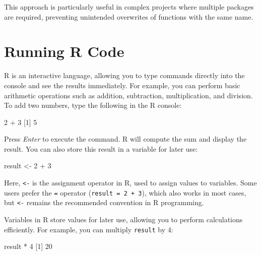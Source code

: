 \documentclass[
  11pt,
]{book}
\makeatletter
\newenvironment{Shaded}{}{}
\newcommand{\DecValTok}[1]{#1}
\newcommand{\NormalTok}[1]{#1}
\newcommand{\OtherTok}[1]{\textcolor[rgb]{0.39,0.39,0.39}{#1}}
\newcommand{\SpecialCharTok}[1]{\textcolor[rgb]{0.39,0.39,0.39}{#1}}
\newenvironment{kframe}{%
\medskip{}
\setlength{\fboxsep}{.8em}
 \def\at@end@of@kframe{}%
 \ifinner\ifhmode%
  \def\at@end@of@kframe{\end{minipage}}%
  \begin{minipage}{\columnwidth}%
 \fi\fi%
 \def\FrameCommand##1{\hskip\@totalleftmargin \hskip-\fboxsep
 \colorbox{shadecolor}{##1}\hskip-\fboxsep
     \hskip-\linewidth \hskip-\@totalleftmargin \hskip\columnwidth}%
 \MakeFramed {\advance\hsize-\width
   \@totalleftmargin\z@ \linewidth\hsize
   \@setminipage}}%
 {\par\unskip\endMakeFramed%
 \at@end@of@kframe}
\renewenvironment{Shaded}{\begin{kframe}}{\end{kframe}}
\theoremstyle{definition}
\theoremstyle{definition}
\theoremstyle{definition}
\theoremstyle{definition}
\theoremstyle{remark}
\makeatother
\begin{document}
This approach is particularly useful in complex projects where multiple packages are required, preventing unintended overwrites of functions with the same name.

\section{Running R Code}\label{running-r-code}

R is an interactive language, allowing you to type commands directly into the console and see the results immediately. For example, you can perform basic arithmetic operations such as addition, subtraction, multiplication, and division. To add two numbers, type the following in the R console:

\begin{Shaded}
\begin{Highlighting}[]
\DecValTok{2} \SpecialCharTok{+} \DecValTok{3}
\NormalTok{   [}\DecValTok{1}\NormalTok{] }\DecValTok{5}
\end{Highlighting}
\end{Shaded}

Press \emph{Enter} to execute the command. R will compute the sum and display the result. You can also store this result in a variable for later use:

\begin{Shaded}
\begin{Highlighting}[]
\NormalTok{result }\OtherTok{\textless{}{-}} \DecValTok{2} \SpecialCharTok{+} \DecValTok{3}
\end{Highlighting}
\end{Shaded}

Here, \texttt{\textless{}-} is the assignment operator in R, used to assign values to variables. Some users prefer the \texttt{=} operator (\texttt{result\ =\ 2\ +\ 3}), which also works in most cases, but \texttt{\textless{}-} remains the recommended convention in R programming.

Variables in R store values for later use, allowing you to perform calculations efficiently. For example, you can multiply \texttt{result} by 4:

\begin{Shaded}
\begin{Highlighting}[]
\NormalTok{result }\SpecialCharTok{*} \DecValTok{4}
\NormalTok{   [}\DecValTok{1}\NormalTok{] }\DecValTok{20}
\end{Highlighting}
\end{Shaded}
\end{document}
